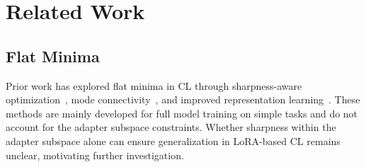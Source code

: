 \documentclass{article}
\theoremstyle{plain}
\theoremstyle{definition}
\theoremstyle{remark}
\begin{document}










\section{Related Work}


\subsection{Flat Minima}
Prior work has explored flat minima in CL through sharpness-aware optimization~\cite{pmlr-v151-bisla22a,foretSharpnessAwareMinimizationEfficiently2021,zhangGradientNormAware2023}, mode connectivity~\cite{izmailov2019averagingweightsleadswider,mirzadeh2020linearmodeconnectivitymultitask}, and improved representation learning~\cite{hu2022doesselfsupervisedpretrainingperform,ramasesh2022effect}.
These methods are mainly developed for full model training on simple tasks and do not account for the adapter subspace constraints\cite{yangRevisitingFlatnessAwareOptimization2025}. Whether sharpness within the adapter subspace alone can ensure generalization in LoRA-based CL remains unclear, motivating further investigation.
\end{document}
